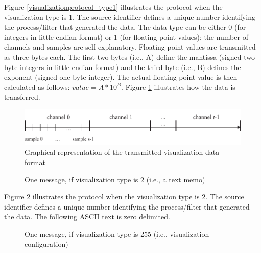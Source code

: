 \documentclass[letterpaper,oneside,12pt]{book}
\begin{document}
Figure \ref{visualizationprotocol_type1} illustrates the protocol when the 
visualization type is 1. The source identifier defines a unique number 
identifying the process/filter that generated the data. The data type can be 
either 0 (for integers in little endian format) or 1 (for floating-point 
values); the number of channels and samples are self explanatory. Floating point 
values are transmitted as three bytes each. The first two bytes (i.e., A) define 
the mantissa (signed two-byte integers in little endian format) and the third 
byte (i.e., B) defines the exponent (signed one-byte integer). The actual floating 
point value is then calculated as follows: $value=A*10^{B}$. Figure 
\ref{visualization_type1} illustrates how the data is transferred.

\begin{figure}[ht]
 \centerline{\includegraphics{figures/visualization_type1}}
 \caption{Graphical representation of the transmitted visualization data format}
 \label{visualization_type1}
\end{figure}

\begin{figure}[ht]
 \centerline{}
 \caption{One message, if visualization type is 2 (i.e., a text memo)}
 \label{visualizationprotocol_type2}
\end{figure}

Figure \ref{visualizationprotocol_type2} illustrates the protocol when the 
visualization type is 2. The source identifier defines a unique number 
identifying the process/filter that generated the data. The following ASCII
text is zero delimited.

\begin{figure}[ht]
 \centerline{}
 \caption{One message, if visualization type is 255 (i.e., visualization configuration)}
 \label{visualizationprotocol_type255}
\end{figure}
\end{document}
